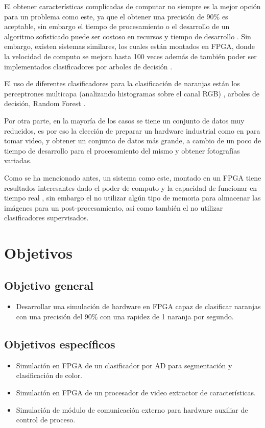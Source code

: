 \documentclass[twoside,spanish,ESP,MSc]{plantillaLabUPV}
\theoremstyle{definition}
\begin{document}
El obtener características complicadas de computar no siempre es la mejor opción para un problema como este, ya que el obtener una precisión de 90\% es aceptable, sin embargo el tiempo de procesamiento o el desarrollo de un algoritmo sofisticado puede ser costoso en recursos y tiempo de desarrollo \cite{khoje}. Sin embargo, existen sistemas similares, los cuales están montados en FPGA, donde la velocidad de computo se mejora hasta 100 veces \cite{faste} además de también poder ser implementados clasificadores por arboles de decisión \cite{friend}.

El uso de diferentes clasificadores para la clasificación de naranjas están los perceptrones multicapa (analizando histogramas sobre el canal RGB) \cite{classi,analis}, arboles de decisión, Random Forest \cite{analis,rfrf}. 

Por otra parte, en la mayoría de los casos se tiene un conjunto de datos muy reducidos, es por eso la elección de preparar un hardware industrial como en \cite{machineorang,machinefruit} para tomar video, y obtener un conjunto de datos más grande, a cambio de un poco de tiempo de desarrollo para el procesamiento del mismo y obtener fotografías variadas.

Como se ha mencionado antes, un sistema como este, montado en un FPGA tiene resultados interesantes dado el poder de computo y la capacidad de funcionar en tiempo real \cite{josu}, sin embargo el no utilizar algún tipo de memoria para almacenar las imágenes para un post-procesamiento, así como también el no utilizar clasificadores supervisados.


\section{Objetivos}
\subsection*{Objetivo general}
\begin{itemize}[noitemsep]
 \item Desarrollar una simulación de hardware en FPGA capaz de clasificar naranjas con una precisión del 90\% con una rapidez de 1 naranja por segundo.
\end{itemize}

\subsection*{Objetivos específicos}
\begin{itemize}[noitemsep]
 \item Simulación en FPGA de un clasificador por AD para segmentación y clasificación de color.
 \item Simulación en FPGA de un procesador de video extractor de características.
 \item Simulación de módulo de comunicación externo para hardware auxiliar de control de proceso.

\end{itemize}
\end{document}
